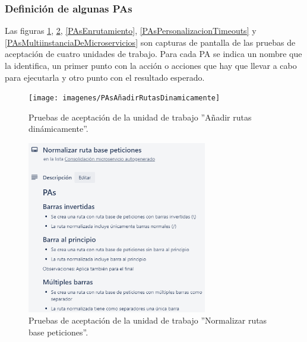 \documentclass[11pt,spanish,listoffigures]{tfgetsinf}
\begin{document}

			\subsubsection{Definición de algunas PAs}

Las figuras \ref{PAsAñadirRutasDinamicamente}, \ref{PAsNormalizarRutaBasePeticiones}, \ref{PAsEnrutamiento}, \ref{PAsPersonalizacionTimeouts} y \ref{PAsMultiinstanciaDeMicroservicios} son capturas de pantalla de las pruebas de aceptación de cuatro unidades de trabajo. Para cada PA se indica un nombre que la identifica, un primer punto con la acción o acciones que hay que llevar a cabo para ejecutarla y otro punto con el resultado esperado.

\begin{figure}[ht]
\centering
\texttt{[image: imagenes/PAsAñadirRutasDinamicamente]}
\caption{Pruebas de aceptación de la unidad de trabajo ''Añadir rutas dinámicamente''.}
	\label{PAsAñadirRutasDinamicamente}
\end{figure}

\begin{figure}[ht]
\centering
\includegraphics[width=0.7\textwidth]{imagenes/PAsNormalizarRutaBasePeticiones}
\caption{Pruebas de aceptación de la unidad de trabajo ''Normalizar rutas base peticiones''.}
	\label{PAsNormalizarRutaBasePeticiones}
\end{figure}
\end{document}
